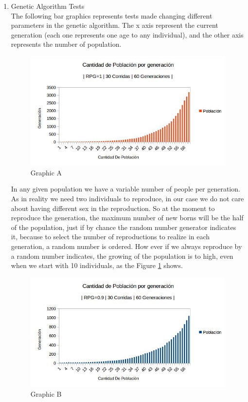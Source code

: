\documentclass[twocolumn]{IEEEtran}
\begin{document}
\begin{enumerate}
\item {Genetic Algorithm Tests}\\

The following bar graphics represents tests made changing different parameters in the genetic algorithm. The x axis represent the current generation (each one represents one age to any individual), and the other axis represents the number of population. 
    
    \begin{figure}[h!]
    \centering
    \includegraphics[width=\columnwidth]{src/rpg1.jpg}
	\caption{Graphic A}
    \label{fig:TESTRPG1}
    \end{figure}
    
In any given population we have a variable number of people per generation. As in reality we need two individuals to reproduce, in our case we do not care about having different sex in the reproduction. So at the moment to reproduce the generation, the maximum number of new borns will be the half of the population, just if by chance the random number generator indicates it, because to select the number of reproductions to realize in each generation, a random number is ordered. How ever if we always reproduce by a random number indicates, the growing of the population is to high, even when we start with 10 individuals, as the Figure \ref{fig:TESTRPG1} shows.\\


    \begin{figure}[h!]
    \centering
    \includegraphics[width=\columnwidth]{src/rpg0_9.jpg}
	\caption{Graphic B}
    \label{fig:TESTRPG0.9}
    \end{figure}
    

\end{enumerate}
\end{document}
